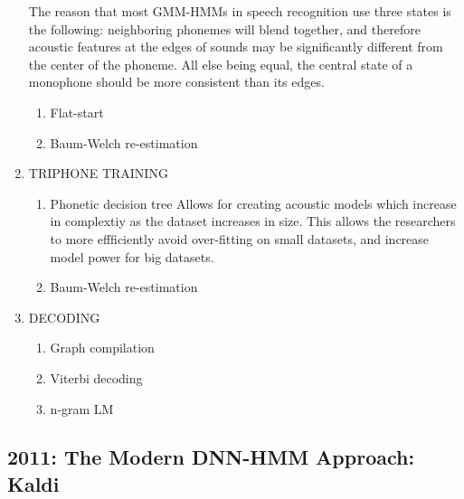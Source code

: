 \documentclass[10pt,a4paper]{article}
\begin{document}
\begin{enumerate}
The reason that most GMM-HMMs in speech recognition use three states is the following: neighboring phonemes will blend together, and therefore acoustic features at the edges of sounds may be significantly different from the center of the phoneme. All else being equal, the central state of a monophone should be more consistent than its edges.

  
  
  \begin{enumerate}
  \item Flat-start
  \item Baum-Welch re-estimation
  \end{enumerate}
  
\item TRIPHONE TRAINING
    \begin{enumerate}
    \item Phonetic decision tree
      Allows for creating acoustic models which increase in complextiy as the dataset increases in size. This allows the researchers to more effficiently avoid over-fitting on small datasets, and increase model power for big datasets.
    \item Baum-Welch re-estimation
    \end{enumerate}

\item DECODING
  \begin{enumerate}
  \item Graph compilation
  \item Viterbi decoding
  \item n-gram LM
  \end{enumerate}
  
\end{enumerate}






\subsection{2011: The Modern DNN-HMM Approach: Kaldi}
\end{document}
